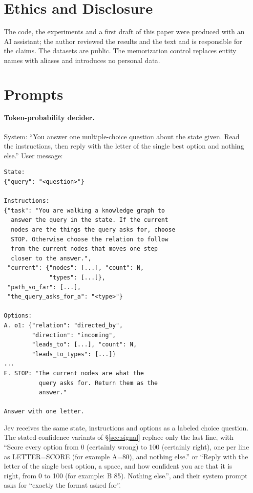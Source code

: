 \documentclass[11pt]{article}
\begin{document}
\section*{Ethics and Disclosure}

The code, the experiments and a first draft of this paper were produced with an AI
assistant; the author reviewed the results and the text and is responsible for the
claims. The datasets are public. The
memorization control replaces entity names with aliases and introduces no personal data.



\appendix

\section{Prompts}
\label{app:prompts}

\paragraph{Token-probability decider.} System: ``You answer one multiple-choice
question about the state given. Read the instructions, then reply with the letter of the
single best option and nothing else.'' User message:
\begin{scriptsize}
\begin{verbatim}
State:
{"query": "<question>"}

Instructions:
{"task": "You are walking a knowledge graph to
  answer the query in the state. If the current
  nodes are the things the query asks for, choose
  STOP. Otherwise choose the relation to follow
  from the current nodes that moves one step
  closer to the answer.",
 "current": {"nodes": [...], "count": N,
             "types": [...]},
 "path_so_far": [...],
 "the_query_asks_for_a": "<type>"}

Options:
A. o1: {"relation": "directed_by",
        "direction": "incoming",
        "leads_to": [...], "count": N,
        "leads_to_types": [...]}
...
F. STOP: "The current nodes are what the
          query asks for. Return them as the
          answer."

Answer with one letter.
\end{verbatim}
\end{scriptsize}
Jev receives the same state, instructions and options as a labeled choice question.
The stated-confidence variants of \S\ref{sec:signal} replace only the last line, with ``Score every
option from 0 (certainly wrong) to 100 (certainly right), one per line as LETTER=SCORE
(for example A=80), and nothing else.'' or ``Reply with the letter of the single best
option, a space, and how confident you are that it is right, from 0 to 100 (for example:
B 85). Nothing else.'', and their system prompt asks for ``exactly the format asked
for''.
\end{document}
